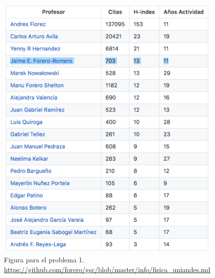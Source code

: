 \documentclass{article}
\begin{document}
\begin{figure}[!h]
\begin{center}
\includegraphics[scale=0.50]{scholar_fisica.png}
\caption{Figura para el problema 1. \url{https://github.com/forero/gsc/blob/master/info/fisica_uniandes.md}\label{table:fisica}}
\end{center}
\end{figure}
\end{document}
